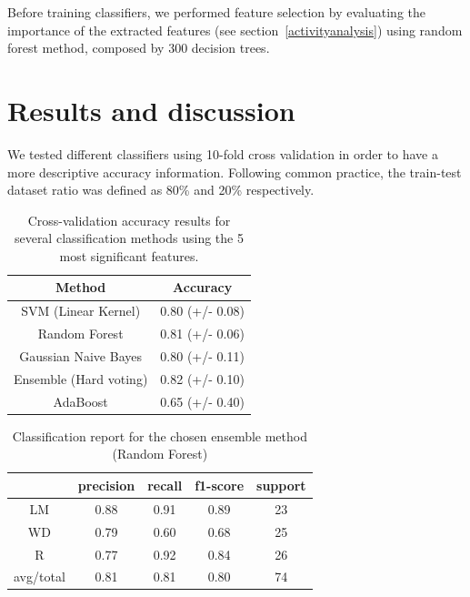 Before training classifiers, we performed feature selection by evaluating the importance of the extracted features (see section~\ref{activityanalysis}) using random forest method, composed by 300 decision trees.%

\section{Results and discussion}\label{discussion}

We tested different classifiers using 10-fold cross validation in order to have a more descriptive accuracy information. Following common practice, the train-test dataset ratio was defined as 80\% and 20\% respectively.

\begin{table}[h]\footnotesize
  \centering
  \caption{Cross-validation accuracy results for several classification methods using the 5 most significant features.%
  }
  \begin{tabular}{| c | c |}
    \hline
  	   \textbf{Method}          & \textbf{Accuracy}\\\hline
       SVM (Linear Kernel)      & 0.80 (+/- 0.08)  \\\hline
       Random Forest            & 0.81 (+/- 0.06)  \\\hline
       Gaussian Naive Bayes     & 0.80 (+/- 0.11)  \\\hline
       Ensemble (Hard voting)   & 0.82 (+/- 0.10)  \\\hline
       AdaBoost                 & 0.65 (+/- 0.40)   \\\hline
  \end{tabular}
  \label{accuracy5best}
\end{table}

\begin{table}[h]\footnotesize
  \centering
  \caption{Classification report for the chosen ensemble method (Random Forest)}
  \begin{tabular}{| c | c | c | c | c |}
    \hline
  	   & precision   & recall & f1-score &  support \\\hline
    LM &      0.88   &  0.91  &    0.89  &      23  \\\hline
    WD &      0.79   &  0.60 &     0.68 &       25  \\\hline
     R &      0.77   &  0.92 &     0.84 &       26  \\\hline
avg/total &   0.81   &  0.81 &     0.80 &       74  \\\hline
  \end{tabular}
  \label{report}
\end{table}


